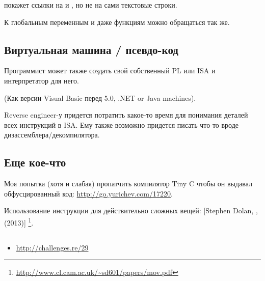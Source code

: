 \IDA{} покажет ссылки на  и , но не на сами текстовые строки.

К глобальным переменным и даже функциям можно обращаться так же.

\subsection{Виртуальная машина / псевдо-код}

Программист может также создать свой собственный \ac{PL} или \ac{ISA} и интерпретатор для него.

(Как версии Visual Basic перед 5.0, .NET or Java machines).

Reverse engineer-у придется потратить какое-то время для понимания деталей всех инструкций в \ac{ISA}.
Ему также возможно придется писать что-то вроде дизассемблера/декомпилятора.

\subsection{Еще кое-что}

Моя попытка (хотя и слабая) пропатчить компилятор Tiny C чтобы он выдавал обфусцированный код:
\url{http://go.yurichev.com/17220}.

Использование инструкции \MOV для действительно сложных вещей: 
[Stephen Dolan, , (2013)]
\footnote{\AlsoAvailableAs \url{http://www.cl.cam.ac.uk/~sd601/papers/mov.pdf}}. 

\subsection{\Exercise}

\begin{itemize}
	\item \url{http://challenges.re/29}
\end{itemize}

